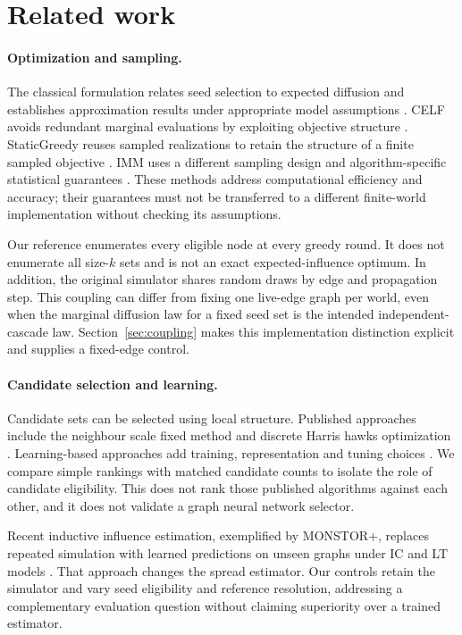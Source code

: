 \section{Related work}
\paragraph{Optimization and sampling.}
The classical formulation relates seed selection to expected diffusion and establishes approximation results under appropriate model assumptions \cite{ref1}. CELF avoids redundant marginal evaluations by exploiting objective structure \cite{ref7}. StaticGreedy reuses sampled realizations to retain the structure of a finite sampled objective \cite{ref8}. IMM uses a different sampling design and algorithm-specific statistical guarantees \cite{ref2}. These methods address computational efficiency and accuracy; their guarantees must not be transferred to a different finite-world implementation without checking its assumptions.

Our reference enumerates every eligible node at every greedy round. It does not enumerate all size-$k$ sets and is not an exact expected-influence optimum. In addition, the original simulator shares random draws by edge and propagation step. This coupling can differ from fixing one live-edge graph per world, even when the marginal diffusion law for a fixed seed set is the intended independent-cascade law. Section~\ref{sec:coupling} makes this implementation distinction explicit and supplies a fixed-edge control.

\paragraph{Candidate selection and learning.}
Candidate sets can be selected using local structure. Published approaches include the neighbour scale fixed method and discrete Harris hawks optimization \cite{ref12,ref13}. Learning-based approaches add training, representation and tuning choices \cite{ref10,ref14}. We compare simple rankings with matched candidate counts to isolate the role of candidate eligibility. This does not rank those published algorithms against each other, and it does not validate a graph neural network selector.

Recent inductive influence estimation, exemplified by MONSTOR+, replaces repeated simulation with learned predictions on unseen graphs under IC and LT models \cite{ref19}. That approach changes the spread estimator. Our controls retain the simulator and vary seed eligibility and reference resolution, addressing a complementary evaluation question without claiming superiority over a trained estimator.

